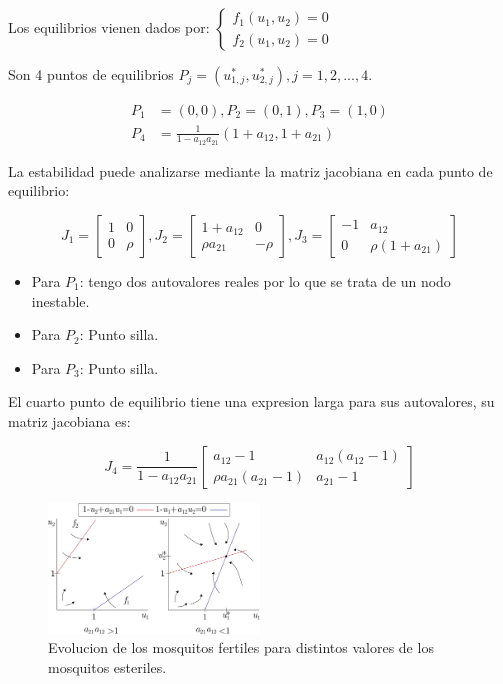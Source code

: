 \documentclass[twocolumn,aps,prl]{revtex4-1}
\begin{document}
Los equilibrios vienen dados por: $\left\lbrace
\begin{aligned}
    f_1(u_1, u_2) = 0\\ 
    f_2(u_1, u_2) = 0
\end{aligned} \right.
$

Son 4 puntos de equilibrios $P_j = (u^*_{1,j},u^*_{2,j}), j= 1, 2, ..., 4$.

$$
\begin{aligned}
    P_1 &= (0, 0), P_2 = (0, 1), P_3 = (1, 0) \\ 
    P_4 &= \frac{1}{1-a_{12} a_{21}}(1+a_{12}, 1+a_{21})
\end{aligned}
$$

La estabilidad puede analizarse mediante la matriz jacobiana en cada punto de equilibrio:

$$
J_1 = \begin{bmatrix}
    1 & 0 \\
    0 & \rho 
\end{bmatrix}
,
J_2 = \begin{bmatrix}
    1 + a_{12} & 0 \\
     \rho a_{21} & - \rho 
\end{bmatrix}
,
J_3 = \begin{bmatrix}
    -1 & a_{12} \\
    0      & \rho \left( 1 + a_{21} \right)
\end{bmatrix}
$$

\begin{itemize}
    \item Para $P_1$: tengo dos autovalores reales por lo que se trata de un nodo inestable.
    \item Para $P_2$: Punto silla.
    \item Para $P_3$: Punto silla.
\end{itemize}

El cuarto punto de equilibrio tiene una expresion larga para sus autovalores, su matriz jacobiana es:

$$
J_4 = 
\frac{1}{1-a_{12} a_{21}}
\begin{bmatrix}
    a_{12} - 1 & a_{12} (a_{12} - 1) \\
    \rho a_{21} (a_{21} - 1) & a_{21} - 1
\end{bmatrix}
$$


\begin{figure}
    \centering
    \includegraphics[width=0.5\textwidth]{figuras/equilibrio.pdf}
    \caption{Evolucion de los mosquitos fertiles para distintos valores de los mosquitos esteriles.}
    \label{fig:mosquitos}
\end{figure}
\end{document}
